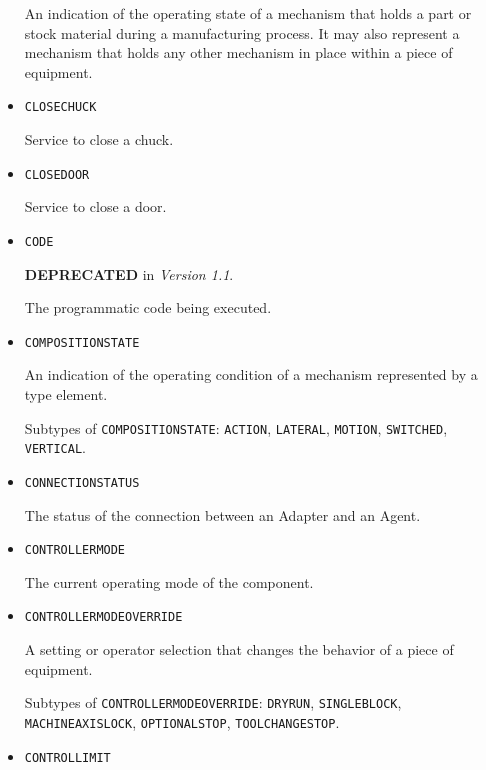 \begin{itemize}
An indication of the operating state of a mechanism that holds a part or stock material during a manufacturing process. It may also represent a mechanism that holds any other mechanism in place within a piece of equipment.


\item \texttt{CLOSE\textunderscore CHUCK}  

Service to close a chuck.


\item \texttt{CLOSE\textunderscore DOOR}  

Service to close a door.


\item \texttt{CODE}  

\textbf{DEPRECATED} in \textit{Version 1.1}.

The programmatic code being executed.


\item \texttt{COMPOSITION\textunderscore STATE}  

An indication of the operating condition of a mechanism represented by a  type element.

Subtypes of \texttt{COMPOSITION\textunderscore STATE}: \texttt{ACTION}, \texttt{LATERAL}, \texttt{MOTION}, \texttt{SWITCHED}, \texttt{VERTICAL}.

\item \texttt{CONNECTION\textunderscore STATUS}  

The status of the connection between an \gls{Adapter} and an \gls{Agent}.


\item \texttt{CONTROLLER\textunderscore MODE}  

The current operating mode of the  component.


\item \texttt{CONTROLLER\textunderscore MODE\textunderscore OVERRIDE}  

A setting or operator selection that changes the behavior of a piece of equipment.

Subtypes of \texttt{CONTROLLER\textunderscore MODE\textunderscore OVERRIDE}: \texttt{DRY\textunderscore RUN}, \texttt{SINGLE\textunderscore BLOCK}, \texttt{MACHINE\textunderscore AXIS\textunderscore LOCK}, \texttt{OPTIONAL\textunderscore STOP}, \texttt{TOOL\textunderscore CHANGE\textunderscore STOP}.

\item \texttt{CONTROL\textunderscore LIMIT}  


\end{itemize}
